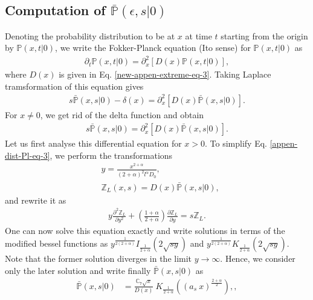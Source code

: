 \documentclass[superscriptaddress,amsmath,amssymb,aps,onecolumn]{revtex4}
\begin{document}
\subsection{Computation of $\bar{\mathbb{P}}(\epsilon, s|0)$}
\label{appen-dist-Pl-prob}
Denoting the probability distribution to be at $x$ at time $t$ starting from the origin by $\mathbb{P}(x,t|0)$, we write the Fokker-Planck equation (Ito sense) for $\mathbb{P}(x,t|0)$ as 
\begin{align}
\partial _t \mathbb{P}(x,t|0) = \partial _{x}^2 \left[ D(x) \mathbb{P}(x,t|0) \right],
\label{appen-dist-Pl-eq-1}
\end{align} 
where $D(x)$ is given in Eq. \eqref{new-appen-extreme-eq-3}. Taking Laplace tramsformation of this equation gives  
\begin{align}
s \bar{\mathbb{P}}(x,s|0)-\delta(x) = \partial _{x}^2 \left[ D(x) \bar{\mathbb{P}}(x,s|0) \right].
\label{appen-dist-Pl-eq-2}
\end{align}
For $x \neq 0$, we get rid of the delta function and obtain
\begin{align}
s \bar{\mathbb{P}}(x,s|0) = \partial _{x}^2 \left[ D(x) \bar{\mathbb{P}}(x,s|0) \right].
\label{appen-dist-Pl-eq-3}
\end{align}
Let us first analyse this differential equation for $x>0$. To simplify Eq. \eqref{appen-dist-Pl-eq-3}, we perform the transformations
\begin{align}
 & y = \frac{x^{2+\alpha}}{(2+\alpha)^2 l^{\alpha} D_0}, \label{appen-dist-Pl-eq-4} \\
 & \mathbb{Z}_L \left(x,s \right)= D(x) \bar{\mathbb{P}}(x,s|0), \label{appen-dist-Pl-eq-5} 
\end{align}
and rewrite it as
\begin{align}
y \frac{\partial ^2 \mathbb{Z}_L}{\partial y^2} + \left(\frac{1+\alpha}{2+\alpha} \right) \frac{\partial  \mathbb{Z}_L}{\partial y} = s \mathbb{Z}_L.
\label{appen-dist-Pl-eq-6} 
\end{align}
One can now solve this equation exactly and write solutions in terms of the modified bessel functions as $y^{\frac{1}{2(2+\alpha)}} I_{\frac{1}{2+\alpha}} \left( 2 \sqrt{s y}\right)$ and $y^{\frac{1}{2(2+\alpha)}} K_{\frac{1}{2+\alpha}} \left( 2 \sqrt{s y}\right)$. Note that the former solution diverges in the limit $y \to \infty$. Hence, we consider only the later solution and write finally $\bar{\mathbb{P}}(x,s|0)$ as
\begin{align}
\bar{\mathbb{P}}(x,s|0) & = \frac{\mathbb{C}_7 \sqrt{x}}{D(x)}~K_{\frac{1}{2+\alpha}} \left( (a_{s}~ x)^{\frac{2+\alpha}{2}}\right),,
\label{appen-dist-Pl-eq-7} 
\end{align}
\end{document}
